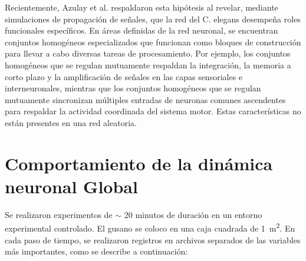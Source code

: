 Recientemente, Azulay et al. \cite{azulay_c_2016} respaldaron esta hipótesis al revelar, mediante simulaciones de propagación de señales, que la red del C. elegans desempeña roles funcionales específicos. En áreas definidas de la red neuronal, se encuentran conjuntos homogéneos especializados que funcionan como bloques de construcción para llevar a cabo diversas tareas de procesamiento. Por ejemplo, los conjuntos homogéneos que se regulan mutuamente respaldan la integración, la memoria a corto plazo y la amplificación de señales en las capas sensoriales e interneuronales, mientras que los conjuntos homogéneos que se regulan mutuamente sincronizan múltiples entradas de neuronas comunes ascendentes para respaldar la actividad coordinada del sistema motor. Estas características no están presentes en una red aleatoria.  








\section{Comportamiento de la dinámica neuronal Global}



Se realizaron experimentos de $\sim$ 20 minutos de duración en un entorno experimental controlado. El gusano se coloco en una caja cuadrada de \qty{1}{\m^2}. En cada paso de tiempo, se realizaron registros en archivos separados de las variables más importantes, como se describe a continuación:

